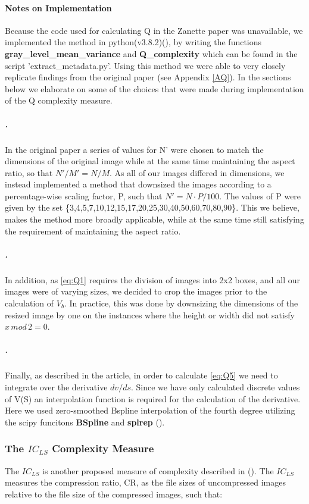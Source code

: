 \documentclass[12pt]{article}
\begin{document}
\paragraph{Notes on Implementation}
Because the code used for calculating Q in the Zanette paper was unavailable, we implemented the method in python(v3.8.2)(\cite{pythonsoftwarefoundationPython2020}), by writing the functions \textbf{gray\_level\_mean\_variance} and \textbf{Q\_complexity} which can be found in the script 'extract\_metadata.py'. Using this method we were able to very closely replicate findings from the original paper (see Appendix \ref{AQ}). In the sections below we elaborate on some of the choices that were made during implementation of the Q complexity measure.
\subparagraph{.}
In the original paper a series of values for N' were chosen to match the dimensions of the original image while at the same time maintaining the aspect ratio, so that $N'/M' = N/M$. As all of our images differed in dimensions, we instead implemented a method that downsized the images according to a percentage-wise scaling factor, P, such that $N' = N \cdot P/100$. The values of P were given by the set \{3,4,5,7,10,12,15,17,20,25,30,40,50,60,70,80,90\}. This we believe, makes the method more broadly applicable, while at the same time still satisfying the requirement of maintaining the aspect ratio.
\subparagraph{.}
In addition, as \ref{eq:Q1} requires the division of images into 2x2 boxes, and all our images were of varying sizes, we decided to crop the images prior to the calculation of $V_b$. In practice, this was done by downsizing the dimensions of the resized image by one on the instances where the height or width did not satisfy $x\,mod\,2 = 0$.
\subparagraph{.}
Finally, as described in the article, in order to calculate \ref{eq:Q5} we need to integrate over the derivative $dv/ds$. 
Since we have only calculated discrete values of V(S) an interpolation function is required for the calculation of the derivative. Here we used zero-smoothed Bspline interpolation of the fourth degree utilizing the scipy funcitons \textbf{BSpline} and \textbf{splrep} (\cite{virtanenSciPyFundamentalAlgorithms2020}).

\subsubsection{The $IC_{LS}$ Complexity Measure}\label{ICLS}
The $IC_{LS}$ is another proposed measure of complexity described in (\cite{yuImageComplexitySpatial2013}). 
The $IC_{LS}$ measures the compression ratio, CR, as the file sizes of uncompressed images relative to the file size of the compressed images, such that:
\end{document}
